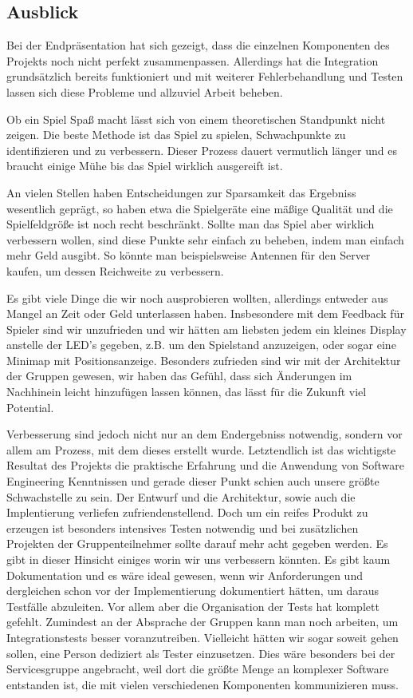 \subsection{Ausblick}

Bei der Endpräsentation hat sich gezeigt, dass die einzelnen Komponenten des
Projekts noch nicht perfekt zusammenpassen. Allerdings hat die Integration
grundsätzlich bereits funktioniert und mit weiterer Fehlerbehandlung und
Testen lassen sich diese Probleme und allzuviel Arbeit beheben.

Ob ein Spiel Spaß macht lässt sich von einem theoretischen Standpunkt nicht
zeigen. Die beste Methode ist das Spiel zu spielen, Schwachpunkte zu
identifizieren und zu verbessern. Dieser Prozess dauert vermutlich länger und
es braucht einige Mühe bis das Spiel wirklich ausgereift ist.

An vielen Stellen haben Entscheidungen zur Sparsamkeit das Ergebniss wesentlich
geprägt, so haben etwa die Spielgeräte eine mäßige Qualität und die
Spielfeldgröße ist noch recht beschränkt. Sollte man das Spiel aber wirklich
verbessern wollen, sind diese Punkte sehr einfach zu beheben, indem man einfach
mehr Geld ausgibt. So könnte man beispielsweise Antennen für den Server kaufen,
um dessen Reichweite zu verbessern.

Es gibt viele Dinge die wir noch ausprobieren wollten, allerdings entweder aus
Mangel an Zeit oder Geld unterlassen haben. Insbesondere mit dem Feedback für
Spieler sind wir unzufrieden und wir hätten am liebsten jedem ein kleines
Display anstelle der LED's gegeben, z.B. um den Spielstand anzuzeigen, oder
sogar eine Minimap mit Positionsanzeige. Besonders zufrieden sind wir mit der
Architektur der Gruppen gewesen, wir haben das Gefühl, dass sich Änderungen im
Nachhinein leicht hinzufügen lassen können, das lässt für die Zukunft viel
Potential.

Verbesserung sind jedoch nicht nur an dem Endergebniss notwendig, sondern vor
allem am Prozess, mit dem dieses erstellt wurde. Letztendlich ist das wichtigste
Resultat des Projekts die praktische Erfahrung und die Anwendung von Software
Engineering Kenntnissen und gerade dieser Punkt schien auch unsere größte
Schwachstelle zu sein. Der Entwurf und die Architektur, sowie auch die
Implentierung verliefen zufriendenstellend. Doch um ein reifes Produkt zu
erzeugen ist besonders intensives Testen notwendig und bei zusätzlichen
Projekten der Gruppenteilnehmer sollte darauf mehr acht gegeben werden. Es gibt
in dieser Hinsicht einiges worin wir uns verbessern könnten. Es gibt kaum
Dokumentation und es wäre ideal gewesen, wenn wir Anforderungen und dergleichen
schon vor der Implementierung dokumentiert hätten, um daraus Testfälle
abzuleiten. Vor allem aber die Organisation der Tests hat komplett gefehlt.
Zumindest an der Absprache der Gruppen kann man noch arbeiten, um
Integrationstests besser voranzutreiben. Vielleicht hätten wir sogar soweit
gehen sollen, eine Person dediziert als Tester einzusetzen. Dies wäre
besonders bei der Servicesgruppe angebracht, weil dort die größte Menge an
komplexer Software entstanden ist, die mit vielen verschiedenen Komponenten
kommunizieren muss.

